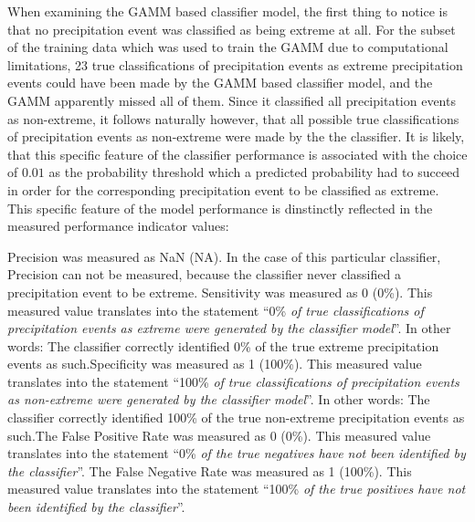 \documentclass[
  12pt,
]{article}
\begin{document}
When examining the GAMM based classifier model, the first thing to
notice is that no precipitation event was classified as being extreme at
all. For the subset of the training data which was used to train the
GAMM due to computational limitations, 23 true classifications of
precipitation events as extreme precipitation events could have been
made by the GAMM based classifier model, and the GAMM apparently missed
all of them. Since it classified all precipitation events as
non-extreme, it follows naturally however, that all possible true
classifications of precipitation events as non-extreme were made by the
the classifier. It is likely, that this specific feature of the
classifier performance is associated with the choice of \(0.01\) as the
probability threshold which a predicted probability had to succeed in
order for the corresponding precipitation event to be classified as
extreme. This specific feature of the model performance is dinstinctly
reflected in the measured performance indicator values:

\textbullet Precision was measured as NaN (NA). In the case of this
particular classifier, Precision can not be measured, because the
classifier never classified a precipitation event to be extreme.
\textbullet Sensitivity was measured as 0 (0\%). This measured value
translates into the statement \textquotedblleft0\%
\textit{of true classifications of precipitation events as extreme were generated by the classifier model}\textquotedblright.
In other words: The classifier correctly identified 0\% of the true
extreme precipitation events as such.\newline \textbullet Specificity
was measured as 1 (100\%). This measured value translates into the
statement \textquotedblleft100\%
\textit{of true classifications of precipitation events as non-extreme were generated by the classifier model}\textquotedblright.
In other words: The classifier correctly identified 100\% of the true
non-extreme precipitation events as such.\newline \textbullet The False
Positive Rate was measured as 0 (0\%). This measured value translates
into the statement \textquotedblleft0\%
\textit{of the true negatives have not been identified by the classifier}\textquotedblright.\newline
\textbullet The False Negative Rate was measured as 1 (100\%). This
measured value translates into the statement \textquotedblleft100\%
\textit{of the true positives have not been identified by the classifier}\textquotedblright.
\end{document}
